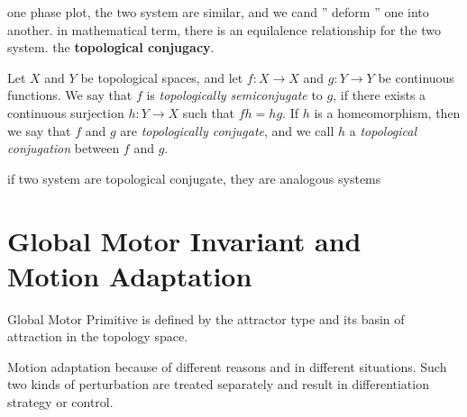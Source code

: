 one phase plot, the two system are similar, and we cand '' deform '' one into another.
in mathematical term, there is an equilalence relationship  for the two system. the \textbf{topological conjugacy}.

Let $X$ and $Y$ be topological spaces, and let $f\colon X\to X$ and $g\colon Y\to Y$
be continuous functions. We say that $f$ is
\emph{topologically semiconjugate} to $g$, if there exists a continuous
surjection $h\colon Y\to X$ such that $fh=hg$. If $h$ is a homeomorphism,
then we say that $f$ and $g$ are \emph{topologically conjugate}, and we call
$h$ a \emph{topological conjugation} between $f$ and $g$.



if two system are topological conjugate, they are analogous systems





\section{Global Motor Invariant and Motion Adaptation}
Global Motor Primitive is defined by the attractor type and its basin of attraction in the topology space.


Motion adaptation because of different reasons and in different situations.
Such two kinds of perturbation are treated separately and result in differentiation strategy or control.

